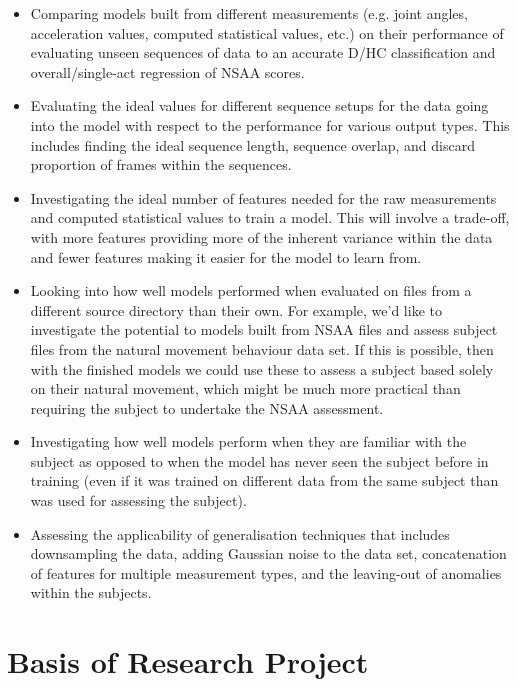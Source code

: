 \documentclass[12pt,twoside]{report}
\begin{document}
\begin{itemize}
	\item Comparing models built from different measurements (e.g. joint angles, acceleration values, computed statistical values, etc.) on their performance of evaluating unseen sequences of data to an accurate D/HC classification and overall/single-act regression of NSAA scores.
	\item Evaluating the ideal values for different sequence setups for the data going into the model with respect to the performance for various output types. This includes finding the ideal sequence length, sequence overlap, and discard proportion of frames within the sequences.
	\item Investigating the ideal number of features needed for the raw measurements and computed statistical values to train a model. This will involve a trade-off, with more features providing more of the inherent variance within the data and fewer features making it easier for the model to learn from.
	\item Looking into how well models performed when evaluated on files from a different source directory than their own. For example, we’d like to investigate the potential to models built from NSAA files and assess subject files from the natural movement behaviour data set. If this is possible, then with the finished models we could use these to assess a subject based solely on their natural movement, which might be much more practical than requiring the subject to undertake the NSAA assessment.
	\item Investigating how well models perform when they are familiar with the subject as opposed to when the model has never seen the subject before in training (even if it was trained on different data from the same subject than was used for assessing the subject).
	\item Assessing the applicability of generalisation techniques that includes downsampling the data, adding Gaussian noise to the data set, concatenation of features for multiple measurement types, and the leaving-out of anomalies within the subjects.
\end{itemize}


\chapter{Basis of Research Project\\}

\end{document}
